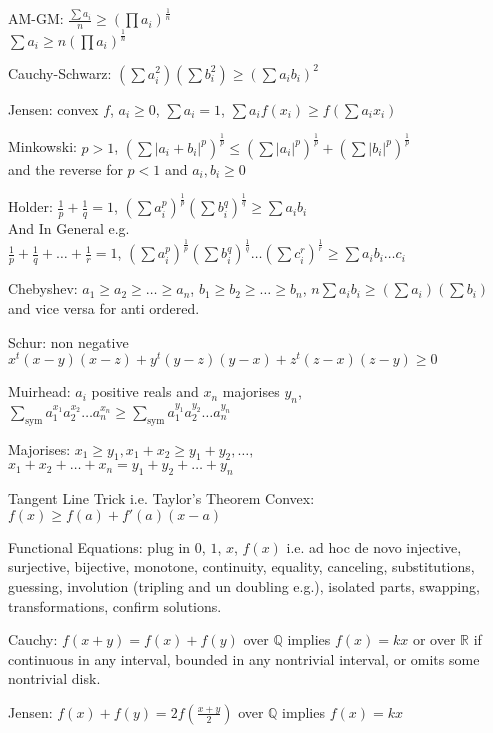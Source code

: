AM-GM: $\frac{\sum a_i}{n} \ge \left(\prod a_i \right)^{\frac{1}{n}}$ \\
$\sum a_i \ge n \left(\prod a_i \right)^{\frac{1}{n}}$

Cauchy-Schwarz: $\left(\sum a_i^2 \right)\left(\sum b_i^2 \right) \ge \left(\sum a_i b_i \right)^2$

Jensen: convex $f$, $a_i \ge 0$, $\sum a_i = 1$, $\sum a_i f(x_i) \ge f\left(\sum a_i x_i \right)$

Minkowski: $p>1$, $(\sum |a_i+b_i|^p)^{\frac{1}{p}} \le (\sum |a_i|^p)^{\frac{1}{p}} + (\sum |b_i|^p)^{\frac{1}{p}}$ \\
and the reverse for $p<1$ and $a_i,b_i \ge 0$

Holder: $\frac{1}{p}+\frac{1}{q}=1$, $\left(\sum a_i^p \right)^{\frac{1}{p}} \left(\sum b_i^q \right)^{\frac{1}{q}} \ge \sum a_i b_i$ \\
And In General e.g. \\
$\frac{1}{p}+\frac{1}{q}+\dots+\frac{1}{r}=1$, $\left(\sum a_i^p \right)^{\frac{1}{p}} \left(\sum b_i^q \right)^{\frac{1}{q}} \dots \left(\sum c_i^r \right)^{\frac{1}{r}} \ge \sum a_i b_i \dots c_i$

Chebyshev: $a_1 \ge a_2 \ge \dots \ge a_n$, $b_1 \ge b_2 \ge \dots \ge b_n$, $n \sum a_i b_i \ge (\sum a_i)(\sum b_i)$ and vice versa for anti ordered.

Schur: non negative $x^t (x-y)(x-z)+y^t (y-z)(y-x)+z^t (z-x)(z-y) \ge 0$

Muirhead: $a_i$ positive reals and $x_n$ majorises $y_n$, $\sum_{\text{sym}} a_1^{x_1}a_2^{x_2}\dots a_n^{x_n} \ge \sum_{\text{sym}} a_1^{y_1}a_2^{y_2}\dots a_n^{y_n}$

Majorises: $x_1 \ge y_1, x_1+x_2 \ge y_1+y_2, \dots ,$ \\
$x_1+x_2+\dots+x_n=y_1+y_2+\dots+y_n$

Tangent Line Trick i.e. Taylor's Theorem Convex: $f(x) \ge f(a) + f'(a)(x-a)$

Functional Equations: plug in $0$, $1$, $x$, $f(x)$ i.e. ad hoc de novo injective, surjective, bijective, monotone, continuity, equality, canceling, substitutions, guessing, involution (tripling and un doubling e.g.), isolated parts, swapping, transformations, confirm solutions.

Cauchy: $f(x+y)=f(x)+f(y)$ over $\mathbb{Q}$ implies $f(x)=kx$ or over $\mathbb{R}$ if continuous in any interval, bounded in any nontrivial interval, or omits some nontrivial disk.

Jensen: $f(x)+f(y)=2f \left( \frac{x+y}{2} \right)$ over $\mathbb{Q}$ implies $f(x)=kx$

